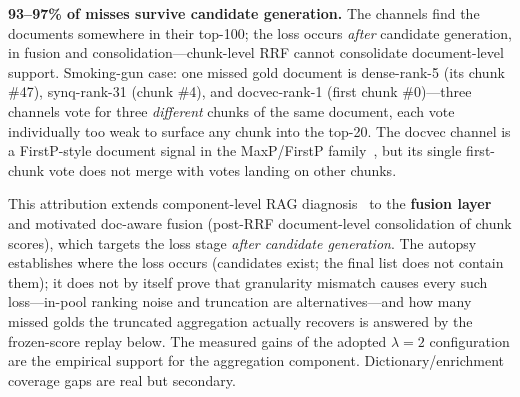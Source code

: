 \documentclass[sigconf,nonacm]{acmart}
\begin{document}
\textbf{93--97\% of misses survive candidate generation.} The channels
find the documents somewhere in their top-100; the loss occurs
\emph{after} candidate generation, in fusion and
consolidation---chunk-level RRF cannot consolidate document-level
support. Smoking-gun case: one missed gold
document is dense-rank-5 (its chunk \#47), synq-rank-31 (chunk \#4), and
docvec-rank-1 (first chunk \#0)---three channels vote for three
\emph{different} chunks of the same document, each vote individually too weak
to surface any chunk into the top-20. The docvec channel is a
FirstP-style document signal in the MaxP/FirstP family~\cite{maxp}, but its single
first-chunk vote does not merge with votes landing on other chunks.

This attribution extends component-level RAG
diagnosis~\cite{ragchecker} to the \textbf{fusion layer} and motivated
doc-aware fusion (post-RRF document-level consolidation of chunk
scores), which targets the loss stage \emph{after candidate generation}.
The autopsy establishes where the loss occurs (candidates exist; the
final list does not contain them); it does not by itself prove that
granularity mismatch causes every such loss---in-pool ranking noise and
truncation are alternatives---and how many missed golds the truncated
aggregation actually recovers is answered by the frozen-score replay
below. The measured gains of the adopted $\lambda{=}2$
configuration are the empirical support for the aggregation component.
Dictionary/enrichment coverage gaps are real but secondary.
\end{document}
